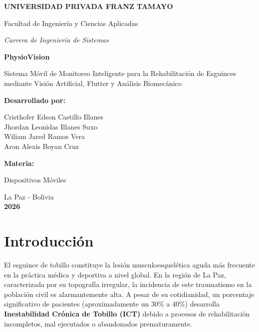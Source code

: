 \documentclass[12pt, a4paper]{article}
\begin{document}
\begin{titlepage}
    \centering
    \vspace*{1cm}
    {\bfseries\LARGE UNIVERSIDAD PRIVADA FRANZ TAMAYO \par}
    \vspace{0.5cm}
    {\large Facultad de Ingeniería y Ciencias Aplicadas \par}
    \vspace{0.5cm}
    {\itshape\Large Carrera de Ingeniería de Sistemas \par}
    \vspace{2cm}
    
    {\huge\bfseries\color{unifranzblue} PhysioVision \par}
    \vspace{0.5cm}
    {\Large Sistema Móvil de Monitoreo Inteligente para la Rehabilitación de Esguinces mediante Visión Artificial, Flutter y Análisis Biomecánico \par}
    
    \vspace{2.5cm}
    {\Large\textbf{Desarrollado por:}} \\
    \vspace{0.5cm}
    {\large 
    Cristhofer Edson Castillo Illanes \\ 
    Jhordan Leonidas Illanes Suxo \\ 
    Wiliam Jared Ramos Vera \\ 
    Aron Alexis Boyan Cruz \par}
    
    \vspace{1.5cm}
    {\large\textbf{Materia:}} \\
    {\large Dispositivos Móviles \par}
    
    \vfill
    {\Large La Paz - Bolivia \\ \textbf{2026} \par}
\end{titlepage}

\newpage
\tableofcontents
\newpage

\section{Introducción}
El esguince de tobillo constituye la lesión musculoesquelética aguda más frecuente en la práctica médica y deportiva a nivel global. En la región de La Paz, caracterizada por su topografía irregular, la incidencia de este traumatismo en la población civil es alarmantemente alta. A pesar de su cotidianidad, un porcentaje significativo de pacientes (aproximadamente un 30\% a 40\%) desarrolla \textbf{Inestabilidad Crónica de Tobillo (ICT)} debido a procesos de rehabilitación incompletos, mal ejecutados o abandonados prematuramente.
\end{document}

